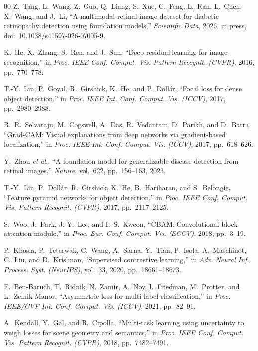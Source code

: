 \documentclass[journal,twoside,web]{ieeecolor}
\begin{document}
\begin{thebibliography}{00}
Z.~Tang, L.~Wang, Z.~Guo, Q.~Liang, S.~Xue, C.~Feng, L.~Ran, L.~Chen,
X.~Wang, and J.~Li, ``A multimodal retinal image dataset for diabetic
retinopathy detection using foundation models,'' \emph{Scientific Data}, 2026,
in press, doi:\ 10.1038/s41597-026-07005-9.

K.~He, X.~Zhang, S.~Ren, and J.~Sun, ``Deep residual learning for image
recognition,'' in \emph{Proc. IEEE Conf. Comput. Vis. Pattern Recognit.
(CVPR)}, 2016, pp.\ 770--778.

T.-Y.~Lin, P.~Goyal, R.~Girshick, K.~He, and P.~Doll\'ar, ``Focal loss for
dense object detection,'' in \emph{Proc. IEEE Int. Conf. Comput. Vis. (ICCV)},
2017, pp.\ 2980--2988.

R.~R.~Selvaraju, M.~Cogswell, A.~Das, R.~Vedantam, D.~Parikh, and D.~Batra,
``Grad-CAM: Visual explanations from deep networks via gradient-based
localization,'' in \emph{Proc. IEEE Int. Conf. Comput. Vis. (ICCV)}, 2017,
pp.\ 618--626.

Y.~Zhou \emph{et al.}, ``A foundation model for generalizable disease detection
from retinal images,'' \emph{Nature}, vol.~622, pp.\ 156--163, 2023.

T.-Y.~Lin, P.~Doll\'ar, R.~Girshick, K.~He, B.~Hariharan, and S.~Belongie,
``Feature pyramid networks for object detection,'' in \emph{Proc. IEEE Conf.
Comput. Vis. Pattern Recognit. (CVPR)}, 2017, pp.\ 2117--2125.

S.~Woo, J.~Park, J.-Y.~Lee, and I.~S.~Kweon, ``CBAM: Convolutional block
attention module,'' in \emph{Proc. Eur. Conf. Comput. Vis. (ECCV)}, 2018,
pp.\ 3--19.

P.~Khosla, P.~Teterwak, C.~Wang, A.~Sarna, Y.~Tian, P.~Isola, A.~Maschinot,
C.~Liu, and D.~Krishnan, ``Supervised contrastive learning,'' in \emph{Adv.
Neural Inf. Process. Syst. (NeurIPS)}, vol.~33, 2020, pp.\ 18661--18673.

E.~Ben-Baruch, T.~Ridnik, N.~Zamir, A.~Noy, I.~Friedman, M.~Protter, and
L.~Zelnik-Manor, ``Asymmetric loss for multi-label classification,'' in
\emph{Proc. IEEE/CVF Int. Conf. Comput. Vis. (ICCV)}, 2021, pp.\ 82--91.

A.~Kendall, Y.~Gal, and R.~Cipolla, ``Multi-task learning using uncertainty to
weigh losses for scene geometry and semantics,'' in \emph{Proc. IEEE Conf.
Comput. Vis. Pattern Recognit. (CVPR)}, 2018, pp.\ 7482--7491.


\end{thebibliography}
\end{document}
